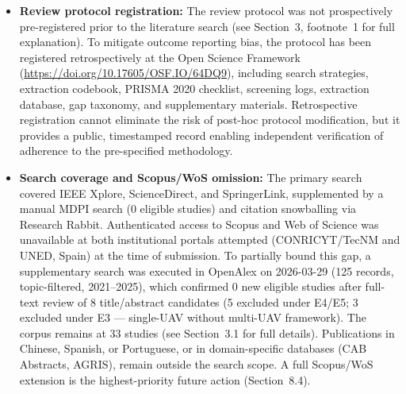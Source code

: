 \documentclass[review,3p,times]{elsarticle}
\begin{document}
\begin{itemize}
  \item \textbf{Review protocol registration:} The review protocol was not prospectively pre-registered prior to the literature search (see Section~3, footnote~1 for full explanation). To mitigate outcome reporting bias, the protocol has been registered retrospectively at the Open Science Framework (\url{https://doi.org/10.17605/OSF.IO/64DQ9}), including search strategies, extraction codebook, PRISMA 2020 checklist, screening logs, extraction database, gap taxonomy, and supplementary materials. Retrospective registration cannot eliminate the risk of post-hoc protocol modification, but it provides a public, timestamped record enabling independent verification of adherence to the pre-specified methodology.
  \item \textbf{Search coverage and Scopus/WoS omission:} The primary search covered IEEE Xplore, ScienceDirect, and SpringerLink, supplemented by a manual MDPI search (0 eligible studies) and citation snowballing via Research Rabbit. Authenticated access to Scopus and Web of Science was unavailable at both institutional portals attempted (CONRICYT/TecNM and UNED, Spain) at the time of submission. To partially bound this gap, a supplementary search was executed in OpenAlex on 2026-03-29 (125 records, topic-filtered, 2021--2025), which confirmed 0 new eligible studies after full-text review of 8 title/abstract candidates (5 excluded under E4/E5; 3 excluded under E3 — single-UAV without multi-UAV framework). The corpus remains at 33 studies (see Section~3.1 for full details). Publications in Chinese, Spanish, or Portuguese, or in domain-specific databases (CAB Abstracts, AGRIS), remain outside the search scope. A full Scopus/WoS extension is the highest-priority future action (Section~8.4).

\end{itemize}
\end{document}
